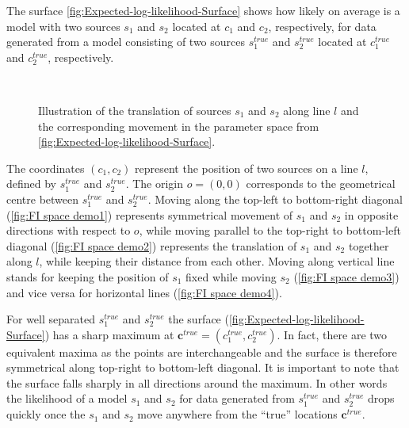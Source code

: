 The surface \autoref{fig:Expected-log-likelihood-Surface} shows how likely on average is a model with two sources $s_1$ and $s_2$ located at $c_1$ and $c_2$, respectively, for data generated from a model consisting of two sources $s_1^{true}$ and $s_2^{true}$ located at $c_1^{true}$ and $c_2^{true}$, respectively. 

\begin{figure}[bt]
	\newcommand{\wf}{.48\textwidth}
	\centering
	 \\
	\caption{Illustration of the translation of sources $s_1$ and $s_2$ along line $l$ and the corresponding movement in the parameter space from \autoref{fig:Expected-log-likelihood-Surface}.}
	\label{fig:FI space demo}
\end{figure}
%
The coordinates $(c_1,c_2)$ represent the position of two sources on a line $l$, defined by $s_1^{true}$ and  $s_2^{true}$. The origin $o=(0,0)$ corresponds to the geometrical centre between $s_1^{true}$ and $s_2^{true}$. Moving along the top-left to bottom-right diagonal (\autoref{fig:FI space demo1}) represents symmetrical movement of $s_1$ and $s_2$  in opposite directions with respect to $o$, while moving parallel to the top-right to bottom-left diagonal (\autoref{fig:FI space demo2}) represents the translation of $s_1$ and $s_2$ together along $l$, while keeping their distance from each other. Moving along vertical line stands for keeping the position of $s_1$ fixed while moving $s_2$ (\autoref{fig:FI space demo3}) and vice versa for horizontal lines (\autoref{fig:FI space demo4}).

For well separated $s_1^{true}$ and $s_2^{true}$ the surface (\autoref{fig:Expected-log-likelihood-Surface}\aaa) has a sharp maximum at $\bm{c}^{true}=(c_1^{true},c_2^{true})$. In fact, there are two equivalent maxima as the points are interchangeable and the surface is therefore symmetrical along top-right to bottom-left diagonal. It is important to note that the surface falls sharply in all directions around the maximum. In other words the likelihood of a model $s_1$ and $s_2$ for data generated from $s_1^{true}$ and $s_2^{true}$ drops quickly once the $s_1$ and $s_2$ move anywhere from the ``true'' locations $\bm{c}^{true}$.

